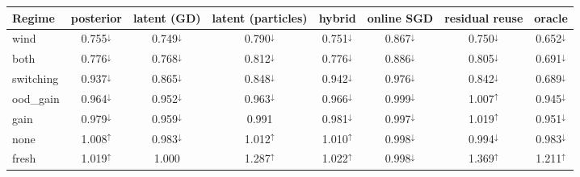 \begin{tabular}{lccccccc}
\toprule
Regime & posterior & latent (GD) & latent (particles) & hybrid & online SGD & residual reuse & oracle \\
\midrule
wind & 0.755$^{\downarrow}$ & 0.749$^{\downarrow}$ & 0.790$^{\downarrow}$ & 0.751$^{\downarrow}$ & 0.867$^{\downarrow}$ & 0.750$^{\downarrow}$ & 0.652$^{\downarrow}$ \\
both & 0.776$^{\downarrow}$ & 0.768$^{\downarrow}$ & 0.812$^{\downarrow}$ & 0.776$^{\downarrow}$ & 0.886$^{\downarrow}$ & 0.805$^{\downarrow}$ & 0.691$^{\downarrow}$ \\
switching & 0.937$^{\downarrow}$ & 0.865$^{\downarrow}$ & 0.848$^{\downarrow}$ & 0.942$^{\downarrow}$ & 0.976$^{\downarrow}$ & 0.842$^{\downarrow}$ & 0.689$^{\downarrow}$ \\
ood\_gain & 0.964$^{\downarrow}$ & 0.952$^{\downarrow}$ & 0.963$^{\downarrow}$ & 0.966$^{\downarrow}$ & 0.999$^{\downarrow}$ & 1.007$^{\uparrow}$ & 0.945$^{\downarrow}$ \\
gain & 0.979$^{\downarrow}$ & 0.959$^{\downarrow}$ & 0.991 & 0.981$^{\downarrow}$ & 0.997$^{\downarrow}$ & 1.019$^{\uparrow}$ & 0.951$^{\downarrow}$ \\
none & 1.008$^{\uparrow}$ & 0.983$^{\downarrow}$ & 1.012$^{\uparrow}$ & 1.010$^{\uparrow}$ & 0.998$^{\downarrow}$ & 0.994$^{\downarrow}$ & 0.983$^{\downarrow}$ \\
fresh & 1.019$^{\uparrow}$ & 1.000 & 1.287$^{\uparrow}$ & 1.022$^{\uparrow}$ & 0.998$^{\downarrow}$ & 1.369$^{\uparrow}$ & 1.211$^{\uparrow}$ \\
\bottomrule
\end{tabular}
